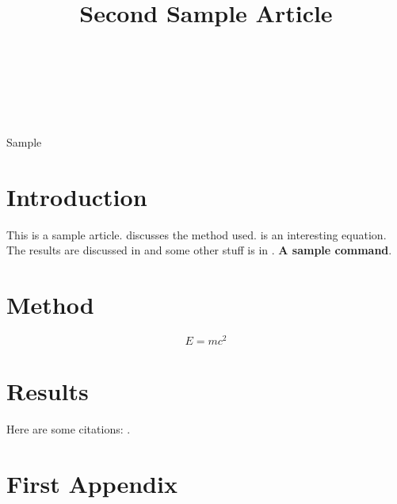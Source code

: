 \documentclass[wcp]{jmlr}
\title[Article 2]{Second Sample Article}
\author{\Name{Bob {de Winter}}\Email{bdw@sample.com}\\
\Name{{\'E}louise Mary Finchley}\Email{emf@sample.com}\\
\Name{Jack Mark Jones}\Email{jmj@sample.com}\\
\addr{University of No Where}}
\newcommand{\samplecommand}{\textbf{A sample command}}
\begin{document}
\maketitle

\begin{abstract}
\lipsum[1]
\end{abstract}
\begin{keywords}
Sample
\end{keywords}

\section{Introduction}

This is a sample article.  discusses
the method used.  is an interesting 
equation. The results are discussed in 
and some other stuff is in .
\samplecommand.

\lipsum

\section{Method}\label{sec:method}

\lipsum

\begin{equation}\label{eq:emc2}
E = mc^2
\end{equation}

\section{Results}\label{sec:results}

\lipsum

Here are some citations: \citet{guyon-elisseeff-03,guyon2007causalreport}.



\appendix
\section{First Appendix}\label{apd:first}

\lipsum
\end{document}
